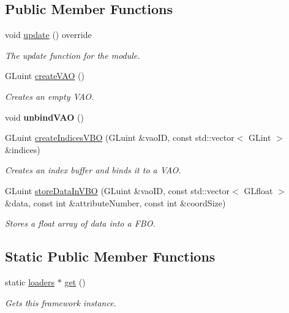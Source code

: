 \subsection*{Public Member Functions}
\begin{DoxyCompactItemize}
\item 
void \hyperlink{classflounder_1_1loaders_a9becf522a74f35f7e3dc7839577ba736}{update} () override
\begin{DoxyCompactList}\small\item\em The update function for the module. \end{DoxyCompactList}\item 
G\+Luint \hyperlink{classflounder_1_1loaders_a90123e47d1422f5e202a7ac439fee050}{create\+V\+AO} ()
\begin{DoxyCompactList}\small\item\em Creates an empty V\+AO. \end{DoxyCompactList}\item 
\mbox{\label{classflounder_1_1loaders_ad408dde74d3bcf097ce9dd97c29e7f12}} 
void {\bfseries unbind\+V\+AO} ()
\item 
G\+Luint \hyperlink{classflounder_1_1loaders_afcc6aaec9391699f25a014a7cd203592}{create\+Indices\+V\+BO} (G\+Luint \&vao\+ID, const std\+::vector$<$ G\+Lint $>$ \&indices)
\begin{DoxyCompactList}\small\item\em Creates an index buffer and binds it to a V\+AO. \end{DoxyCompactList}\item 
G\+Luint \hyperlink{classflounder_1_1loaders_a035a42c2f558c1f126cc54729388fca3}{store\+Data\+In\+V\+BO} (G\+Luint \&vao\+ID, const std\+::vector$<$ G\+Lfloat $>$ \&data, const int \&attribute\+Number, const int \&coord\+Size)
\begin{DoxyCompactList}\small\item\em Stores a float array of data into a F\+BO. \end{DoxyCompactList}\end{DoxyCompactItemize}
\subsection*{Static Public Member Functions}
\begin{DoxyCompactItemize}
\item 
static \hyperlink{classflounder_1_1loaders}{loaders} $\ast$ \hyperlink{classflounder_1_1loaders_ac57855261d2d43c545cac42e9efe981a}{get} ()
\begin{DoxyCompactList}\small\item\em Gets this framework instance. \end{DoxyCompactList}\end{DoxyCompactItemize}

